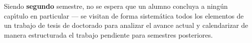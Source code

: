 \documentclass[10 pt]{article}
\begin{document}


Siendo {\bf segundo} semestre, no se espera que un alumno concluya a
ning\'{u}n cap\'{\i}tulo en particular --- se visitan de forma
sistem\'{a}tica todos los elementos de un trabajo de tesis de
doctorado para analizar el avance actual y calendarizar de manera
estructurada el trabajo pendiente para semestres posteriores.


\end{document}
